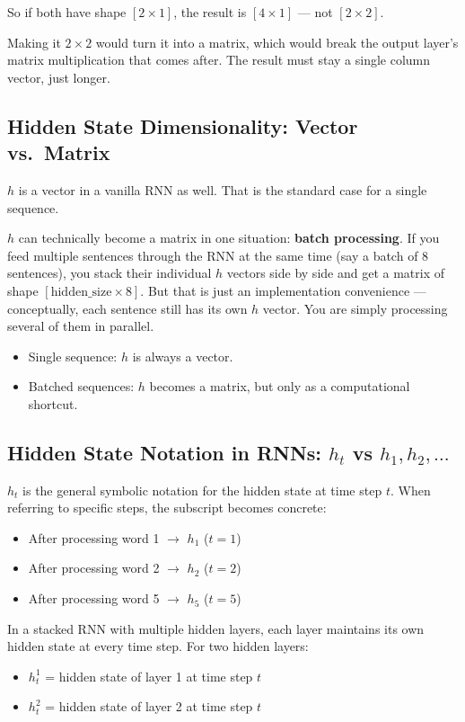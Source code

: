 \documentclass[12pt,a4paper]{article}
\begin{document}
So if both have shape $[2 \times 1]$, the result is $[4 \times 1]$ --- not $[2 \times 2]$.

Making it $2 \times 2$ would turn it into a matrix, which would break the output layer's matrix multiplication that comes after. The result must stay a single column vector, just longer.


\subsection{Hidden State Dimensionality: Vector vs.\ Matrix}

$h$ is a vector in a vanilla RNN as well. That is the standard case for a single sequence.

$h$ can technically become a matrix in one situation: \textbf{batch processing}. If you feed multiple sentences through the RNN at the same time (say a batch of 8 sentences), you stack their individual $h$ vectors side by side and get a matrix of shape $[\text{hidden\_size} \times 8]$. But that is just an implementation convenience --- conceptually, each sentence still has its own $h$ vector. You are simply processing several of them in parallel.

\begin{itemize}
    \item Single sequence: $h$ is always a vector.
    \item Batched sequences: $h$ becomes a matrix, but only as a computational shortcut.
\end{itemize}


\subsection{Hidden State Notation in RNNs: $h_t$ vs $h_1, h_2, \ldots$}
$h_t$ is the general symbolic notation for the hidden state at time step $t$. When referring to specific steps, the subscript becomes concrete:
\begin{itemize}
    \item After processing word 1 $\rightarrow$ $h_1$ \quad ($t = 1$)
    \item After processing word 2 $\rightarrow$ $h_2$ \quad ($t = 2$)
    \item After processing word 5 $\rightarrow$ $h_5$ \quad ($t = 5$)
\end{itemize}

In a stacked RNN with multiple hidden layers, each layer maintains its own hidden state at every time step. For two hidden layers:
\begin{itemize}
    \item $h^1_t$ = hidden state of layer 1 at time step $t$
    \item $h^2_t$ = hidden state of layer 2 at time step $t$
\end{itemize}
\end{document}
